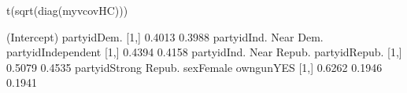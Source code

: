 \begin{Schunk}
\begin{Sinput}
 t(sqrt(diag(myvcovHC)))
\end{Sinput}
\begin{Soutput}
     (Intercept) partyidDem.
[1,]      0.4013      0.3988
     partyidInd. Near Dem. partyidIndependent
[1,]                0.4394             0.4158
     partyidInd. Near Repub. partyidRepub.
[1,]                  0.5079        0.4535
     partyidStrong Repub. sexFemale owngunYES
[1,]               0.6262    0.1946    0.1941
\end{Soutput}
\end{Schunk}
